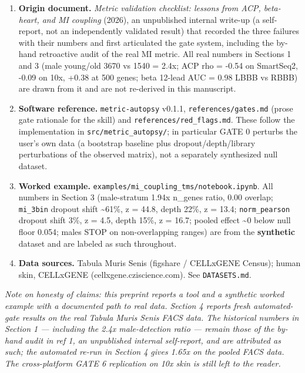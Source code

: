 \documentclass[
  11pt,
]{article}
\providecommand{\tightlist}{%
  \setlength{\itemsep}{0pt}\setlength{\parskip}{0pt}}
\begin{document}
\begin{enumerate}
\def\labelenumi{\arabic{enumi}.}
\tightlist
\item
  \textbf{Origin document.} \emph{Metric validation checklist: lessons
  from ACP, beta-heart, and MI coupling} (2026), an unpublished internal
  write-up (a self-report, not an independently validated result) that
  recorded the three failures with their numbers and first articulated
  the gate system, including the by-hand retroactive audit of the real
  MI metric. All real numbers in Sections 1 and 3 (male young/old 3670
  vs 1540 = 2.4x; ACP rho = -0.54 on SmartSeq2, -0.09 on 10x, +0.38 at
  500 genes; beta 12-lead AUC = 0.98 LBBB vs RBBB) are drawn from it and
  are not re-derived in this manuscript.
\item
  \textbf{Software reference.} \texttt{metric-autopsy} v0.1.1,
  \texttt{references/gates.md} (prose gate rationale for the skill) and
  \texttt{references/red\_flags.md}. These follow the implementation in
  \texttt{src/metric\_autopsy/}; in particular GATE 0 perturbs the
  user's own data (a bootstrap baseline plus dropout/depth/library
  perturbations of the observed matrix), not a separately synthesized
  null dataset.
\item
  \textbf{Worked example.}
  \texttt{examples/mi\_coupling\_tms/notebook.ipynb}. All numbers in
  Section 3 (male-stratum 1.94x n\_genes ratio, 0.00 overlap;
  \texttt{mi\_3bin} dropout shift \textasciitilde61\%, z = 44.8, depth
  22\%, z = 13.4; \texttt{norm\_pearson} dropout shift 3\%, z = 4.5,
  depth 15\%, z = 16.7; pooled effect \textasciitilde0 below null floor
  0.054; males STOP on non-overlapping ranges) are from the
  \textbf{synthetic} dataset and are labeled as such throughout.
\item
  \textbf{Data sources.} Tabula Muris Senis (figshare / CELLxGENE
  Census); human skin, CELLxGENE (cellxgene.cziscience.com). See
  \texttt{DATASETS.md}.
\end{enumerate}

\emph{Note on honesty of claims: this preprint reports a tool and a
synthetic worked example with a documented path to real data. Section 4
reports fresh automated-gate results on the real Tabula Muris Senis FACS
data. The historical numbers in Section 1 --- including the 2.4x
male-detection ratio --- remain those of the by-hand audit in ref 1, an
unpublished internal self-report, and are attributed as such; the
automated re-run in Section 4 gives 1.65x on the pooled FACS data. The
cross-platform GATE 6 replication on 10x skin is still left to the
reader.}
\end{document}
